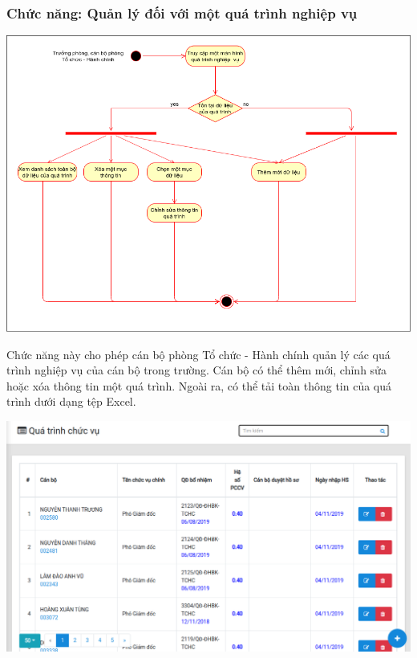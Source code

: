 \subsubsection{Chức năng: Quản lý đối với một quá trình nghiệp vụ}
\begin{center}
  \captionsetup{type=figure}
  \includegraphics[width=15cm]{img/UML/TchcStaff/activityQuanLyQT.png}
\end{center}

Chức năng này cho phép cán bộ phòng Tổ chức - Hành chính quản lý các quá trình nghiệp vụ của cán bộ trong trường. Cán bộ có thể thêm mới, chỉnh sửa hoặc xóa thông tin một quá trình. Ngoài ra, có thể tải toàn thông tin của quá trình dưới dạng tệp Excel.\\
\begin{center}
  \captionsetup{type=figure}
  \includegraphics[width=15cm]{img/Screen/qlquatrinh.png}
\end{center}
